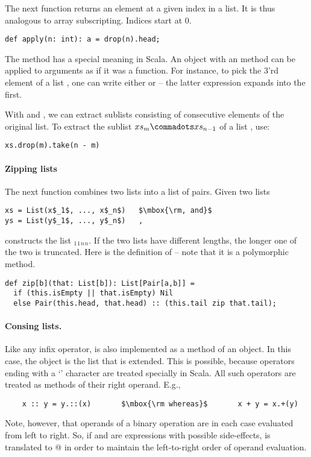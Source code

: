 The next function returns an element at a given index in a list.
It is thus analogous to array subscripting. Indices start at 0.
\begin{lstlisting}   
def apply(n: int): a = drop(n).head;
\end{lstlisting}
The  method has a special meaning in Scala. An object with
an  method can be applied to arguments as if it was a
function. For instance, to pick the 3'rd element of a list ,
one can write either  or  -- the latter
expression expands into the first.

With  and , we can extract sublists consisting
of consecutive elements of the original list.  To extract the sublist
$xs_m \commadots xs_{n-1}$ of a list , use:

\begin{lstlisting}
xs.drop(m).take(n - m)
\end{lstlisting}

\paragraph{Zipping lists} The next function combines two lists into a list of pairs.
Given two lists
\begin{lstlisting}
xs = List(x$_1$, ..., x$_n$)   $\mbox{\rm, and}$
ys = List(y$_1$, ..., y$_n$)   ,
\end{lstlisting}
 constructs the list
$_1$$_1$$_n$$_n$\code{))}.
If the two lists have different lengths, the longer one of the two is
truncated. Here is the definition of  -- note that it is a
polymorphic method.
\begin{lstlisting}
def zip[b](that: List[b]): List[Pair[a,b]] = 
  if (this.isEmpty || that.isEmpty) Nil
  else Pair(this.head, that.head) :: (this.tail zip that.tail);
\end{lstlisting}

\paragraph{Consing lists.}
Like any infix operator, \code{::}
is also implemented as a method of an object. In this case, the object
is the list that is extended. This is possible, because operators
ending with a `\code{:}' character are treated specially in Scala.  
All such operators are treated as methods of their right operand. E.g.,
\begin{lstlisting}
    x :: y = y.::(x)       $\mbox{\rm whereas}$       x + y = x.+(y)                  
\end{lstlisting}
Note, however, that operands of a binary operation are in each case
evaluated from left to right.  So, if  and  are
expressions with possible side-effects,  is translated to
@ in order to maintain the left-to-right
order of operand evaluation.

